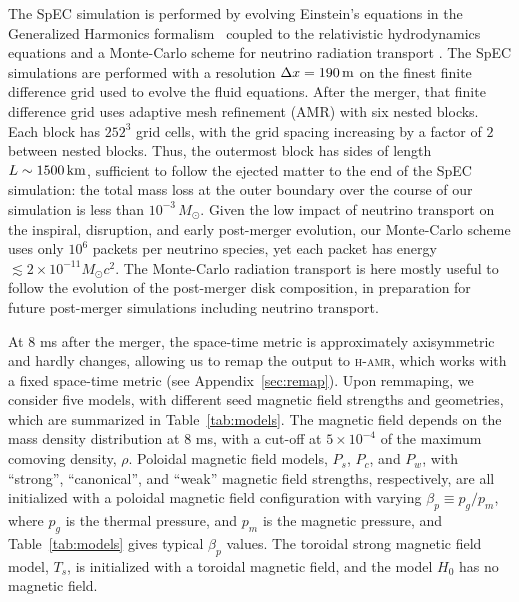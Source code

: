 \documentclass[twocolumn,dvipsnames]{aastex62}
\begin{document}
The SpEC simulation is performed by evolving Einstein's equations in the Generalized Harmonics formalism~\citep{Lindblom:2007} coupled to the relativistic hydrodynamics equations and a Monte-Carlo scheme for neutrino radiation transport \citep[see][for a description of the numerical methods in SpEC]{Duez:2008rb,Foucart:2013a,Foucart:2021mcb}. The SpEC simulations are performed with a resolution $\Delta x = 190\,{\rm m}$ on the finest finite difference grid used to evolve the fluid equations. After the merger, that finite difference grid uses adaptive mesh refinement (AMR) with six nested blocks. Each block has $252^3$ grid cells, with the grid spacing increasing by a factor of $2$ between nested blocks. Thus, the outermost block has sides of length $L\sim 1500\,{\rm km}$, sufficient to follow the ejected matter to the end of the SpEC simulation: the total mass loss at the outer boundary over the course of our simulation is less than $10^{-3}\,M_\odot$. Given the low impact of neutrino transport on the inspiral, disruption, and early post-merger evolution, our Monte-Carlo scheme uses only $10^6$ packets per neutrino species, yet each packet has energy $\lesssim 2 \times 10^{-11} M_\odot c^2$. The Monte-Carlo radiation transport is here mostly useful to follow the evolution of the post-merger disk composition, in preparation for future post-merger simulations including neutrino transport.

At 8 ms after the merger, the space-time metric is approximately axisymmetric and hardly changes, allowing us to remap the output to \textsc{h-amr}, which works with a fixed space-time metric (see Appendix~\ref{sec:remap}). Upon remmaping, we consider five models, with different seed magnetic field strengths and geometries, which are summarized in Table~\ref{tab:models}. The magnetic field depends on the mass density distribution at 8 ms, with a cut-off at $ 5\times 10^{-4} $ of the maximum comoving density, $ \rho $. Poloidal magnetic field models,  $P_s$, $P_c$, and $P_w$, with ``strong'', ``canonical'', and ``weak'' magnetic field strengths, respectively, are all initialized with a poloidal magnetic field configuration with varying $ \beta_p \equiv p_g/p_m $, where $ p_g $ is the thermal pressure, and $ p_m $ is the magnetic pressure, and Table~\ref{tab:models} gives typical $\beta_p$ values. The toroidal strong magnetic field model, $T_s$, is initialized with a toroidal magnetic field, and the model $H_0$ has no magnetic field. 
\end{document}
